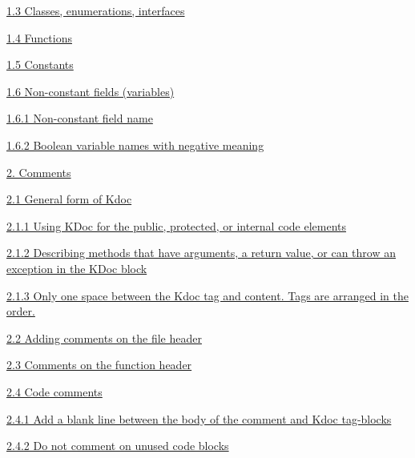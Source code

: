 {{{{{{{{{{{{{{{{\hspace{0.5cm}\hyperref[sec:1.3]{ 1.3 Classes, enumerations, interfaces}

\hspace{0.5cm}\hyperref[sec:1.4]{ 1.4 Functions}

\hspace{0.5cm}\hyperref[sec:1.5]{ 1.5 Constants}

\hspace{0.5cm}\hyperref[sec:1.6]{ 1.6 Non-constant fields (variables)}

\hspace{1.0cm}\hyperref[sec:1.6.1]{ 1.6.1 Non-constant field name}

\hspace{1.0cm}\hyperref[sec:1.6.2]{ 1.6.2 Boolean variable names with negative meaning}

\hspace{0.0cm}\hyperref[sec:]{}

\hspace{0.0cm}\hyperref[sec:2.]{2. Comments}

\hspace{0.5cm}\hyperref[sec:2.1]{ 2.1 General form of Kdoc}

\hspace{1.0cm}\hyperref[sec:2.1.1]{ 2.1.1 Using KDoc for the public, protected, or internal code elements}

\hspace{1.0cm}\hyperref[sec:2.1.2]{ 2.1.2 Describing methods that have arguments, a return value, or can throw an exception in the KDoc block}

\hspace{1.0cm}\hyperref[sec:2.1.3]{ 2.1.3 Only one space between the Kdoc tag and content. Tags are arranged in the order.}

\hspace{0.5cm}\hyperref[sec:2.2]{ 2.2 Adding comments on the file header}

\hspace{0.5cm}\hyperref[sec:2.3]{ 2.3 Comments on the function header}

\hspace{0.5cm}\hyperref[sec:2.4]{ 2.4 Code comments}

\hspace{1.0cm}\hyperref[sec:2.4.1]{ 2.4.1 Add a blank line between the body of the comment and Kdoc tag-blocks}

\hspace{1.0cm}\hyperref[sec:2.4.2]{ 2.4.2 Do not comment on unused code blocks}

}}}}}}}}}}}}}}}}
